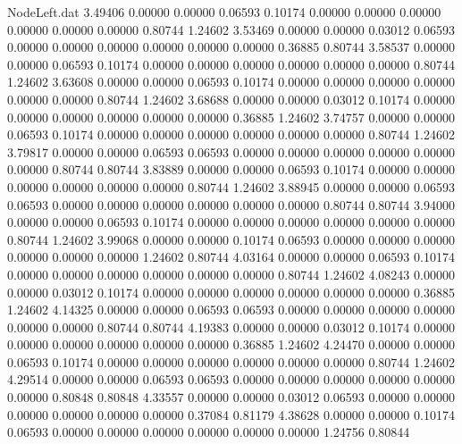 \begin{filecontents}{NodeLeft.dat}
   3.49406    0.00000    0.00000     0.06593    0.10174    0.00000    0.00000    0.00000    0.00000    0.00000    0.00000    0.80744    1.24602
   3.53469    0.00000    0.00000     0.03012    0.06593    0.00000    0.00000    0.00000    0.00000    0.00000    0.00000    0.36885    0.80744
   3.58537    0.00000    0.00000     0.06593    0.10174    0.00000    0.00000    0.00000    0.00000    0.00000    0.00000    0.80744    1.24602
   3.63608    0.00000    0.00000     0.06593    0.10174    0.00000    0.00000    0.00000    0.00000    0.00000    0.00000    0.80744    1.24602
   3.68688    0.00000    0.00000     0.03012    0.10174    0.00000    0.00000    0.00000    0.00000    0.00000    0.00000    0.36885    1.24602
   3.74757    0.00000    0.00000     0.06593    0.10174    0.00000    0.00000    0.00000    0.00000    0.00000    0.00000    0.80744    1.24602
   3.79817    0.00000    0.00000     0.06593    0.06593    0.00000    0.00000    0.00000    0.00000    0.00000    0.00000    0.80744    0.80744
   3.83889    0.00000    0.00000     0.06593    0.10174    0.00000    0.00000    0.00000    0.00000    0.00000    0.00000    0.80744    1.24602
   3.88945    0.00000    0.00000     0.06593    0.06593    0.00000    0.00000    0.00000    0.00000    0.00000    0.00000    0.80744    0.80744
   3.94000    0.00000    0.00000     0.06593    0.10174    0.00000    0.00000    0.00000    0.00000    0.00000    0.00000    0.80744    1.24602
   3.99068    0.00000    0.00000     0.10174    0.06593    0.00000    0.00000    0.00000    0.00000    0.00000    0.00000    1.24602    0.80744
   4.03164    0.00000    0.00000     0.06593    0.10174    0.00000    0.00000    0.00000    0.00000    0.00000    0.00000    0.80744    1.24602
   4.08243    0.00000    0.00000     0.03012    0.10174    0.00000    0.00000    0.00000    0.00000    0.00000    0.00000    0.36885    1.24602
   4.14325    0.00000    0.00000     0.06593    0.06593    0.00000    0.00000    0.00000    0.00000    0.00000    0.00000    0.80744    0.80744
   4.19383    0.00000    0.00000     0.03012    0.10174    0.00000    0.00000    0.00000    0.00000    0.00000    0.00000    0.36885    1.24602
   4.24470    0.00000    0.00000     0.06593    0.10174    0.00000    0.00000    0.00000    0.00000    0.00000    0.00000    0.80744    1.24602
   4.29514    0.00000    0.00000     0.06593    0.06593    0.00000    0.00000    0.00000    0.00000    0.00000    0.00000    0.80848    0.80848
   4.33557    0.00000    0.00000     0.03012    0.06593    0.00000    0.00000    0.00000    0.00000    0.00000    0.00000    0.37084    0.81179
   4.38628    0.00000    0.00000     0.10174    0.06593    0.00000    0.00000    0.00000    0.00000    0.00000    0.00000    1.24756    0.80844

\end{filecontents}

